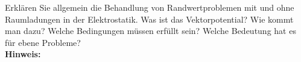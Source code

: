 \begin{question}[section=3,subsection=31,name={Elektrostatik},difficulty=3,type=mdl,tags={}]
	Erklären Sie allgemein die Behandlung von Randwertproblemen mit und ohne Raumladungen in der Elektrostatik. Was ist das Vektorpotential? Wie kommt man dazu? Welche Bedingungen müssen erfüllt sein? Welche Bedeutung hat es für ebene Probleme?
	\\ \textbf{Hinweis:}\\
	
\end{question}
\begin{solution}
	
\end{solution}
